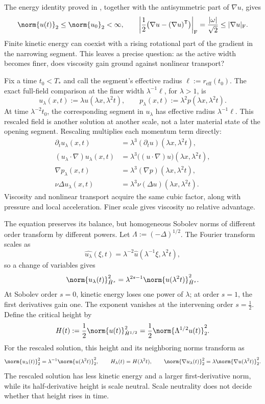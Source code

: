 The energy identity proved in , together with the antisymmetric part of \(\nabla u\), gives
\[
  \norm{u(t)}_2
  \leq
  \norm{u_0}_2
  <\infty,
  \qquad
  \left|\frac12\bigl(\nabla u-(\nabla u)^{\mathsf T}\bigr)\right|_{\mathrm F}
  =
  \frac{|\omega|}{\sqrt2}
  \leq
  |\nabla u|_{\mathrm F}.
\]
Finite kinetic energy can coexist with a rising rotational part of the gradient in the narrowing segment. This leaves a precise question: as the active width becomes finer, does viscosity gain ground against nonlinear transport?


Fix a time \(t_0<T_*\) and call the segment's effective radius \(\ell:=r_{\mathrm{eff}}(t_0)\). The exact full-field comparison at the finer width \(\lambda^{-1}\ell\), for \(\lambda>1\), is
\[
  u_\lambda(x,t)
  :=
  \lambda u(\lambda x,\lambda^2t),
  \qquad
  p_\lambda(x,t)
  :=
  \lambda^2p(\lambda x,\lambda^2t).
\]
At time \(\lambda^{-2}t_0\), the corresponding segment in \(u_\lambda\) has effective radius \(\lambda^{-1}\ell\). This rescaled field is another solution at another scale, not a later material state of the opening segment. Rescaling multiplies each momentum term directly:
\[
\begin{aligned}
  \partial_tu_\lambda(x,t)
  &=
  \lambda^3(\partial_tu)(\lambda x,\lambda^2t),
  \\
  (u_\lambda\cdot\nabla)u_\lambda(x,t)
  &=
  \lambda^3\bigl((u\cdot\nabla)u\bigr)(\lambda x,\lambda^2t),
  \\
  \nabla p_\lambda(x,t)
  &=
  \lambda^3(\nabla p)(\lambda x,\lambda^2t),
  \\
  \nu\Delta u_\lambda(x,t)
  &=
  \lambda^3\nu(\Delta u)(\lambda x,\lambda^2t).
\end{aligned}
\]
Viscosity and nonlinear transport acquire the same cubic factor, along with pressure and local acceleration. Finer scale gives viscosity no relative advantage.


The equation preserves its balance, but homogeneous Sobolev norms of different order transform by different powers. Let \(\Lambda:=(-\Delta)^{1/2}\). The Fourier transform scales as
\[
  \widehat{u_\lambda}(\xi,t)
  =
  \lambda^{-2}\widehat u(\lambda^{-1}\xi,\lambda^2t),
\]
so a change of variables gives
\[
  \norm{u_\lambda(t)}_{\dot H^s}^2
  =
  \lambda^{2s-1}
  \norm{u(\lambda^2t)}_{\dot H^s}^2.
\]
At Sobolev order \(s=0\), kinetic energy loses one power of \(\lambda\); at order \(s=1\), the first derivatives gain one. The exponent vanishes at the intervening order \(s=\tfrac12\). Define the critical height by
\[
  H(t)
  :=
  \frac12\norm{u(t)}_{\dot H^{1/2}}^2
  =
  \frac12\norm{\Lambda^{1/2}u(t)}_2^2.
\]
For the rescaled solution, this height and its neighboring norms transform as
\[
  \norm{u_\lambda(t)}_2^2
  =
  \lambda^{-1}\norm{u(\lambda^2t)}_2^2,
  \qquad
  H_\lambda(t)=H(\lambda^2t),
  \qquad
  \norm{\nabla u_\lambda(t)}_2^2
  =
  \lambda\norm{\nabla u(\lambda^2t)}_2^2.
\]
The rescaled solution has less kinetic energy and a larger first-derivative norm, while its half-derivative height is scale neutral. Scale neutrality does not decide whether that height rises in time.

